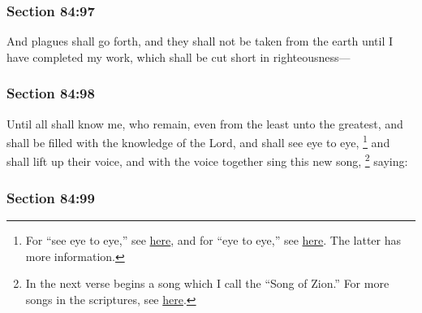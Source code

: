 	\subsubsection{Section 84:97} %
		\label{DC84-97}

		And plagues shall go forth, and they shall not be taken from the earth until I have completed my work, which shall be cut short in righteousness---


	\subsubsection{Section 84:98} %
		\label{DC84-98}

		Until all shall know me, who remain, even from the least unto the greatest, and shall be filled with the knowledge of the Lord, and shall see eye to eye,%
			\footnote{%
				For ``see eye to eye,'' see \hyperref[SEE-PHRASES]{here}, and for ``eye to eye,'' see \hyperref[EYE-PHRASES]{here}. The latter has more information.
				}
		and shall lift up their voice, and with the voice together sing this new song,%
			\footnote{%
				In the next verse begins a song which I call the ``Song of Zion.'' For more songs in the scriptures, see \hyperref[SONG-scriptures]{here}.
				}
		saying:


	\subsubsection{Section 84:99} %
		\label{DC84-99}


